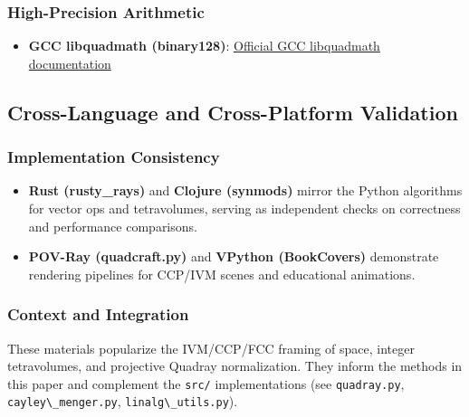 \documentclass[
  10pt,
]{article}
\newcommand{\passthrough}[1]{#1}
\providecommand{\tightlist}{%
  \setlength{\itemsep}{0pt}\setlength{\parskip}{0pt}}
\begin{document}
\hypertarget{high-precision-arithmetic}{%
\subsubsection{High-Precision
Arithmetic}\label{high-precision-arithmetic}}

\begin{itemize}
\tightlist
\item
  \textbf{GCC libquadmath (binary128)}:
  \href{https://gcc.gnu.org/onlinedocs/libquadmath/index.html}{Official
  GCC libquadmath documentation}
\end{itemize}

\hypertarget{cross-language-and-cross-platform-validation}{%
\subsection{Cross-Language and Cross-Platform
Validation}\label{cross-language-and-cross-platform-validation}}

\hypertarget{implementation-consistency}{%
\subsubsection{Implementation
Consistency}\label{implementation-consistency}}

\begin{itemize}
\tightlist
\item
  \textbf{Rust (rusty\_rays)} and \textbf{Clojure (synmods)} mirror the
  Python algorithms for vector ops and tetravolumes, serving as
  independent checks on correctness and performance comparisons.
\item
  \textbf{POV-Ray (quadcraft.py)} and \textbf{VPython (BookCovers)}
  demonstrate rendering pipelines for CCP/IVM scenes and educational
  animations.
\end{itemize}

\hypertarget{context-and-integration}{%
\subsubsection{Context and Integration}\label{context-and-integration}}

These materials popularize the IVM/CCP/FCC framing of space, integer
tetravolumes, and projective Quadray normalization. They inform the
methods in this paper and complement the \passthrough{\lstinline!src/!}
implementations (see \passthrough{\lstinline!quadray.py!},
\passthrough{\lstinline!cayley\_menger.py!},
\passthrough{\lstinline!linalg\_utils.py!}).
\end{document}
